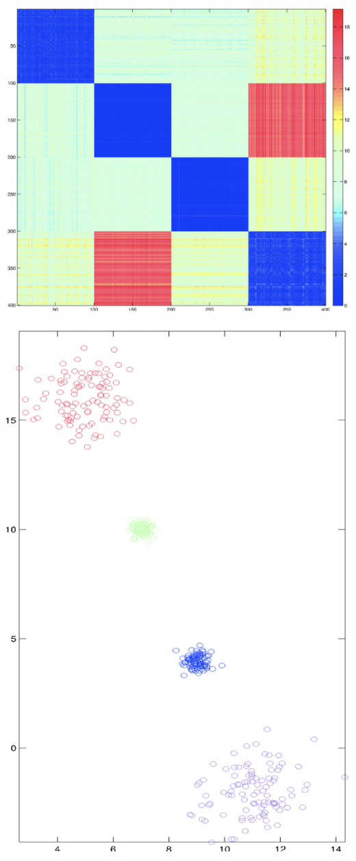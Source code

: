 \documentclass{article}
\begin{document}
\begin{center}
    \includegraphics[scale=0.5]{images/Q2P4C.png}
\end{center}

\begin{center}
    \includegraphics[scale=0.5]{images/Q2P4D.png}
\end{center}
\end{document}
